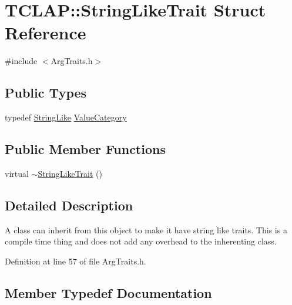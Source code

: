 \hypertarget{struct_t_c_l_a_p_1_1_string_like_trait}{}\section{T\+C\+L\+A\+P\+:\+:String\+Like\+Trait Struct Reference}
\label{struct_t_c_l_a_p_1_1_string_like_trait}


{\ttfamily \#include $<$Arg\+Traits.\+h$>$}

\subsection*{Public Types}
\begin{DoxyCompactItemize}
\item 
typedef \hyperlink{struct_t_c_l_a_p_1_1_string_like}{String\+Like} \hyperlink{struct_t_c_l_a_p_1_1_string_like_trait_a7a081c80b731414dcad1b50cf80b7433}{Value\+Category}
\end{DoxyCompactItemize}
\subsection*{Public Member Functions}
\begin{DoxyCompactItemize}
\item 
virtual \hyperlink{struct_t_c_l_a_p_1_1_string_like_trait_ad7353733df8665d257bd5c4af43d822d}{$\sim$\+String\+Like\+Trait} ()
\end{DoxyCompactItemize}


\subsection{Detailed Description}
A class can inherit from this object to make it have string like traits. This is a compile time thing and does not add any overhead to the inherenting class. 

Definition at line 57 of file Arg\+Traits.\+h.



\subsection{Member Typedef Documentation}
\hypertarget{struct_t_c_l_a_p_1_1_string_like_trait_a7a081c80b731414dcad1b50cf80b7433}{}
